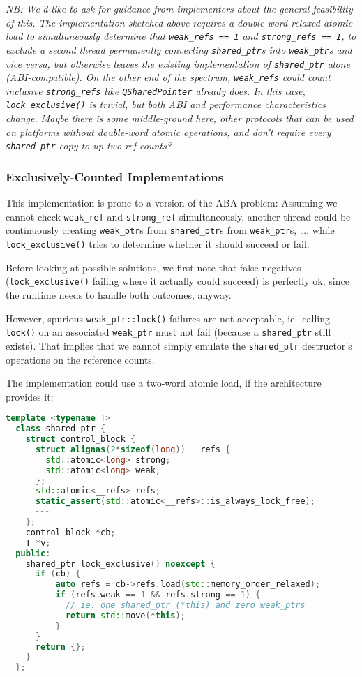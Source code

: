 \documentclass[11pt]{article}
\newcommand{\lockx}{\texttt{lock\_exclusive()}}
\newcommand{\wptr}{\texttt{weak\_ptr}}
\newcommand{\sptr}{\texttt{shared\_ptr}}
\begin{document}
\emph{NB: We'd like to ask for guidance from implementers about the
  general feasibility of this. The implementation sketched above
  requires a double-word relaxed atomic load to simultaneously
  determine that \texttt{weak\_refs == 1} and \texttt{strong\_refs ==
    1}, to exclude a second thread permanently converting \sptr{}s
  into \wptr{}s and vice versa, but otherwise leaves the existing
  implementation of \sptr{} alone (ABI-compatible). On the other end
  of the spectrum, \texttt{weak\_refs} could count inclusive
  \texttt{strong\_refs} like \texttt{QSharedPointer} already does. In
  this case, \lockx{} is trivial\cite{qsp}, but both ABI and
  performance characteristics change. Maybe there is some
  middle-ground here, other protocols that can be used on platforms
  without double-word atomic operations, and don't require every
  \sptr{} copy to up two ref counts?}

\iffalse

\subsubsection{Exclusively-Counted Implementations}

This implementation is prone to a version of the ABA-problem: Assuming
we cannot check \texttt{weak\_ref} and \texttt{strong\_ref}
simultaneously, another thread could be continuously creating \wptr{}s
from \sptr{}s from \wptr{}s, \ldots, while \lockx{} tries to determine
whether it should succeed or fail.

Before looking at possible solutions, we first note that false
negatives (\lockx{} failing where it actually could succeed) is
perfectly ok, since the runtime needs to handle both outcomes, anyway.

However, spurious \texttt{\wptr::lock()} failures are not acceptable,
ie.\ calling \texttt{lock()} on an associated \wptr{} must not fail
(because a \sptr{} still exists). That implies that we cannot simply
emulate the \sptr{} destructor's operations on the reference counts.

The implementation could use a two-word atomic load, if the
architecture provides it:

\begin{lstlisting}[language=C++,caption={Possible implementation of \lockx{} in an exclusively-counted implementation, using DW relaxed load}]
  template <typename T>
  class shared_ptr {
    struct control_block {
      struct alignas(2*sizeof(long)) __refs {
        std::atomic<long> strong;
        std::atomic<long> weak;
      };
      std::atomic<__refs> refs;
      static_assert(std::atomic<__refs>::is_always_lock_free);
      ~~~
    };
    control_block *cb;
    T *v;
  public:
    shared_ptr lock_exclusive() noexcept {
      if (cb) {
          auto refs = cb->refs.load(std::memory_order_relaxed);
          if (refs.weak == 1 && refs.strong == 1) {
            // ie. one shared_ptr (*this) and zero weak_ptrs
            return std::move(*this);
          }
      }
      return {};
    }
  };
\end{lstlisting}
\end{document}
